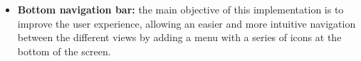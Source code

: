 \begin{itemize}
    
    \item \textbf{Bottom navigation bar:} the main objective of this implementation is to improve the user experience, allowing an easier and more intuitive navigation between the different views by adding a menu with a series of icons at the bottom of the screen.%
    
    

\end{itemize}
